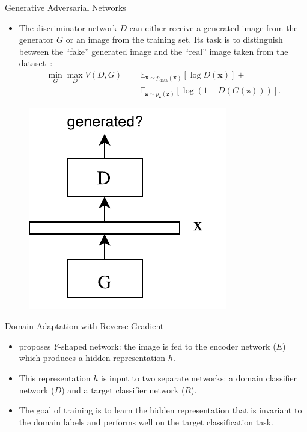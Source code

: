 \documentclass[final]{beamer}
\newlength{\onecolwid}
\begin{document}
\begin{frame}[t]
\begin{columns}[t]
\begin{column}{\onecolwid}
\begin{block}{Generative Adversarial Networks}
\begin{itemize}
        \item The discriminator network $D$
    can either receive a generated image from the generator $G$ or an image
    from the training set. Its task is to distinguish
    between the ``fake'' generated image and the ``real'' image taken from the dataset~\cite{goodfellow2014generative}:
    \begin{align*}
        \min_G \max_D V(D, G) = & \mathbb{E}_{\bm{x} \sim p_{\text{data}}(\bm{x})}[\log D(\bm{x})] + \\
            & \mathbb{E}_{\bm{z} \sim p_{\bm{z}}(\bm{z})}[\log (1 - D(G(\bm{z})))].
    \end{align*}

    \end{itemize}
    \begin{figure}
        \centering
        \includegraphics[width=0.5\linewidth]{gan.pdf}
    \end{figure}
\end{block}


\begin{block}{Domain Adaptation with Reverse Gradient}
    \begin{itemize}
        \item \cite{ganin2014unsupervised} proposes $Y$-shaped network: the image is fed to the
        encoder network ($E$) which produces a hidden representation $h$. 
        
        \item This representation $h$ is input to two separate networks: a domain classifier network ($D$) and 
        a target classifier network ($R$). 
        
        \item The goal of training is to learn the hidden 
        representation that is invariant to the domain labels and performs well on the target classification 
        task. 
        

\end{itemize}
\end{block}
\end{column}
\end{columns}
\end{frame}
\end{document}
